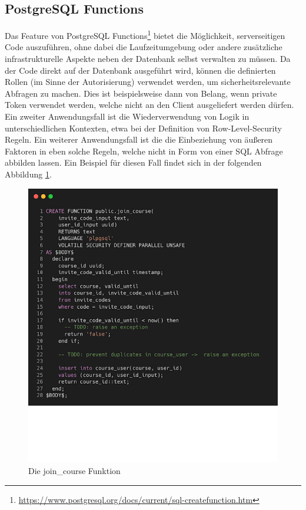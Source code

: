 \subsection{PostgreSQL Functions}
\label{sub:sqlfunc}
Das Feature von PostgreSQL Functions\footnote{\url{https://www.postgresql.org/docs/current/sql-createfunction.htm}} bietet die Möglichkeit, serverseitigen Code auszuführen, ohne dabei die Laufzeitumgebung oder andere zusätzliche infrastrukturelle Aspekte neben der Datenbank selbst verwalten zu müssen. Da der Code direkt auf der Datenbank ausgeführt wird, können die definierten Rollen (im Sinne der Autorisierung) verwendet werden, um sicherheitsrelevante Abfragen zu machen. Dies ist beispielsweise dann von Belang, wenn private Token verwendet werden, welche nicht an den Client ausgeliefert werden dürfen. Ein zweiter Anwendungsfall ist die Wiederverwendung von Logik in unterschiedlichen Kontexten, etwa bei der Definition von Row-Level-Security Regeln. Ein weiterer Anwendungsfall ist die die Einbeziehung von äußeren Faktoren in eben solche Regeln, welche nicht in Form von einer SQL Abfrage abbilden lassen. Ein Beispiel für diesen Fall findet sich in der folgenden Abbildung \ref{fig:func}.
\begin{figure}[H]
    \centering
    \includegraphics[width = .8\textwidth]{images/pfun.png}
    \caption{Die join\_course Funktion}
    \label{fig:func}
\end{figure}
